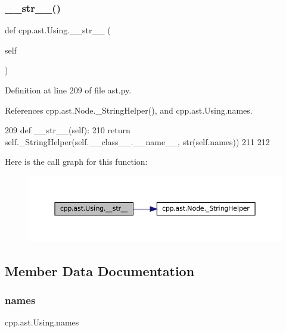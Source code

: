 \subsubsection{\texorpdfstring{\+\_\+\+\_\+str\+\_\+\+\_\+()}{\_\_str\_\_()}}
{\footnotesize\ttfamily def cpp.\+ast.\+Using.\+\_\+\+\_\+str\+\_\+\+\_\+ (\begin{DoxyParamCaption}\item[{}]{self }\end{DoxyParamCaption})}



Definition at line 209 of file ast.\+py.



References cpp.\+ast.\+Node.\+\_\+\+String\+Helper(), and cpp.\+ast.\+Using.\+names.


\begin{DoxyCode}
209     \textcolor{keyword}{def }\_\_str\_\_(self):
210         \textcolor{keywordflow}{return} self.\_StringHelper(self.\_\_class\_\_.\_\_name\_\_, str(self.names))
211 
212 
\end{DoxyCode}
Here is the call graph for this function\+:
\nopagebreak
\begin{figure}[H]
\begin{center}
\leavevmode
\includegraphics[width=350pt]{classcpp_1_1ast_1_1Using_ac209e8e5d84988d14a8f4b30377e5455_cgraph}
\end{center}
\end{figure}


\subsection{Member Data Documentation}
\mbox{\label{classcpp_1_1ast_1_1Using_abc05dedb59eb83857d373cc0e64eccb3}} 
\subsubsection{\texorpdfstring{names}{names}}
{\footnotesize\ttfamily cpp.\+ast.\+Using.\+names}



